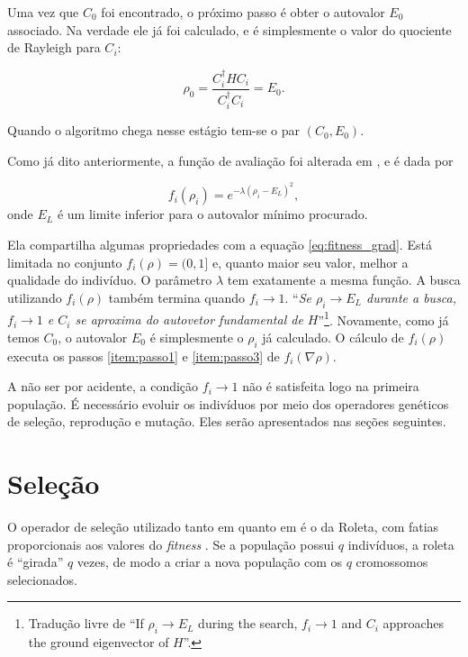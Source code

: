 	Uma vez que $C_0$ foi encontrado, o próximo passo é obter o autovalor $E_0$ associado. Na verdade ele já foi calculado, e é simplesmente o valor do quociente de Rayleigh para $C_i$:
	
	\begin{equation}
		\rho_0 = \frac{C_i^{\dagger} H C_i}{C_i^{\dagger} C_i} = E_0.
	\end{equation}
	
	Quando o algoritmo chega nesse estágio tem-se o par $(C_0,E_0)$.
	
	Como já dito anteriormente, a função de avaliação foi alterada em \cite{metodo2011}, e é dada por 
	
	\begin{equation}\label{eq:fitness_EL_metodo}
		f_i(\rho_i) = e^{-\lambda(\rho_i - E_L)^2},
	\end{equation}
	onde $E_L$ é um limite inferior para o autovalor mínimo procurado.
	
	Ela compartilha algumas propriedades com a equação \ref{eq:fitness_grad}. Está limitada no conjunto $f_i(\rho) = (0,1]$ e, quanto maior seu valor, melhor a qualidade do indivíduo. O parâmetro $\lambda$ tem exatamente a mesma função. A busca utilizando $f_i(\rho)$ também termina quando $f_i \rightarrow 1$. ``\emph{Se $\rho_i \rightarrow E_L$ durante a busca, $f_i \rightarrow 1$ e $C_i$ se aproxima do autovetor fundamental de $H$}''\footnote{Tradução livre de ``If $\rho_i \rightarrow E_L$ during the search, $f_i \rightarrow 1$ and $C_i$ approaches the ground eigenvector of $H$''.}. Novamente, como já temos $C_0$, o autovalor $E_0$ é simplesmente o $\rho_i$ já calculado.	O cálculo de $f_i(\rho)$ executa os passos \ref{item:passo1} e \ref{item:passo3} de $f_i(\nabla\rho)$.
				
		A não ser por acidente, a condição $f_i \rightarrow 1$ não é satisfeita logo na primeira população. É necessário evoluir os indivíduos por meio dos operadores genéticos de seleção, reprodução e mutação. Eles serão apresentados nas seções seguintes.

\section{Seleção}

			O operador de seleção utilizado tanto em \cite{metodo2004} quanto em \cite{metodo2011} é o da Roleta, com fatias proporcionais aos valores do \emph{fitness} \cite{Linden2008}. Se a população possui $q$ indivíduos, a roleta é ``girada'' $q$ vezes, de modo a criar a nova população com os $q$ cromossomos selecionados.
			
